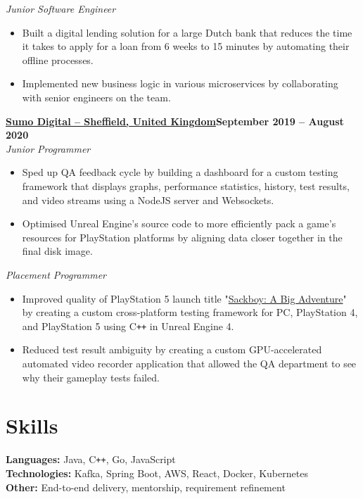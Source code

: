\documentclass[11pt]{article}       %
\begin{document}
\textit{Junior Software Engineer} \\
\vspace{-9pt}
\begin{itemize}
  \item Built a digital lending solution for a large Dutch bank that reduces the time it takes to apply for a loan from 6 weeks to 15 minutes by automating their offline processes.
  \item Implemented new business logic in various microservices by collaborating with senior engineers on the team.
\end{itemize}

\textbf{\href{https://www.sumo-digital.com/}{Sumo Digital -- Sheffield, United Kingdom}\hfill September 2019 -- August 2020} \\
\textit{Junior Programmer} \\
\vspace{-9pt}
\begin{itemize}
  \item Sped up QA feedback cycle by building a dashboard for a custom testing framework that displays graphs, performance statistics, history, test results, and video streams using a NodeJS server and Websockets.
  \item Optimised Unreal Engine's source code to more efficiently pack a game's resources for PlayStation platforms by aligning data closer together in the final disk image.
\end{itemize}

\textit{Placement Programmer} \\
\vspace{-9pt}
\begin{itemize}
  \item Improved quality of PlayStation 5 launch title "\href{https://www.playstation.com/en-us/games/sackboy-a-big-adventure/}{Sackboy: A Big Adventure}" by creating a custom cross-platform testing framework for PC, PlayStation 4, and PlayStation 5 using C\texttt{++} in Unreal Engine 4.
  \item Reduced test result ambiguity by creating a custom GPU-accelerated automated video recorder application that allowed the QA department to see why their gameplay tests failed.
\end{itemize}

\vspace{-18.5pt}

\section*{Skills}
\textbf{Languages:} Java, C\texttt{++}, Go, JavaScript \\
\textbf{Technologies:} Kafka, Spring Boot, AWS, React, Docker, Kubernetes \\
\textbf{Other:} End-to-end delivery, mentorship, requirement refinement
\end{document}
